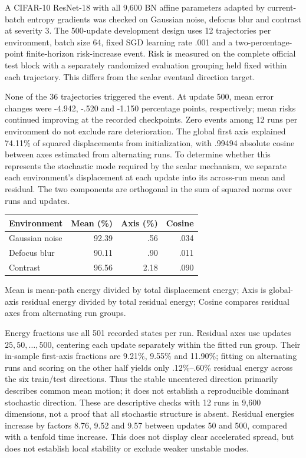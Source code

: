 A CIFAR-10 ResNet-18 with all 9,600 BN affine parameters adapted by current-batch entropy gradients was checked on Gaussian noise, defocus blur and contrast at severity 3. The 500-update development design uses 12 trajectories per environment, batch size 64, fixed SGD learning rate .001 and a two-percentage-point finite-horizon risk-increase event. Risk is measured on the complete official test block with a separately randomized evaluation grouping held fixed within each trajectory. This differs from the scalar eventual direction target.

None of the 36 trajectories triggered the event. At update 500, mean error changes were -4.942, -.520 and -1.150 percentage points, respectively; mean risks continued improving at the recorded checkpoints. Zero events among 12 runs per environment do not exclude rare deterioration. The global first axis explained 74.11\% of squared displacements from initialization, with .99494 absolute cosine between axes estimated from alternating runs. To determine whether this represents the stochastic mode required by the scalar mechanism, we separate each environment's displacement at each update into its across-run mean and residual. The two components are orthogonal in the sum of squared norms over runs and updates.

\begin{center}
\small
\begin{tabular}{lrrr}
\toprule
Environment & Mean (\%) & Axis (\%) & Cosine \\
\midrule
Gaussian noise & 92.39 & .56 & .034 \\
Defocus blur & 90.11 & .90 & .011 \\
Contrast & 96.56 & 2.18 & .090 \\
\bottomrule
\end{tabular}
\end{center}
\noindent Mean is mean-path energy divided by total displacement energy;
Axis is global-axis residual energy divided by total residual energy;
Cosine compares residual axes from alternating run groups.


Energy fractions use all 501 recorded states per run. Residual axes use updates $25,50,\ldots,500$, centering each update separately within the fitted run group. Their in-sample first-axis fractions are 9.21\%, 9.55\% and 11.90\%; fitting on alternating runs and scoring on the other half yields only .12\%--.60\% residual energy across the six train/test directions. Thus the stable uncentered direction primarily describes common mean motion; it does not establish a reproducible dominant stochastic direction. These are descriptive checks with 12 runs in 9,600 dimensions, not a proof that all stochastic structure is absent. Residual energies increase by factors 8.76, 9.52 and 9.57 between updates 50 and 500, compared with a tenfold time increase. This does not display clear accelerated spread, but does not establish local stability or exclude weaker unstable modes.

